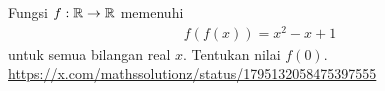 Fungsi $f:\mathbb R \to \mathbb R$ memenuhi
\begin{align*}
    f(f(x)) = x^2-x+1
\end{align*}
untuk semua bilangan real $x$. Tentukan nilai $f(0)$.\\
\url{https://x.com/mathssolutionz/status/1795132058475397555}